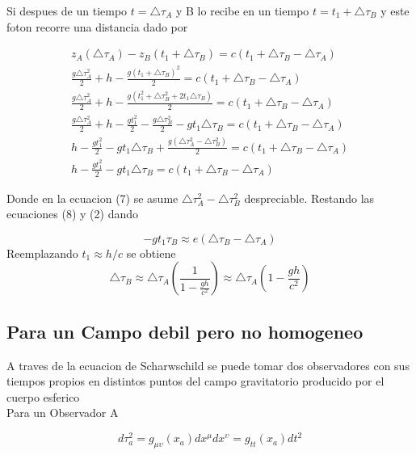 \documentclass[12pt,twoside]{rif}
\begin{document}
Si despues de un tiempo $t=\triangle\tau_{A} $ y B lo recibe en un tiempo 
$ t=t_{1}+\triangle\tau_{B} $ y este foton recorre una distancia dado por

\begin{eqnarray}
z_{A}(\triangle\tau_{A})-z_{B}(t_{1}+\triangle\tau_{B})=c(t_{1}+\triangle\tau_{B}-\triangle\tau_{A}) \\
\frac{g\triangle\tau_{A}^{2}}{2}+h-\frac{g(t_{1}+\triangle\tau_{B})^{2}}{2}=c(t_{1}+\triangle\tau_{B}-\triangle\tau_{A}) \\
\frac{g\triangle\tau_{A}^{2}}{2}+h-\frac{g(t_{1}^{2}+\triangle\tau_{B}^{2}+2t_{1}\triangle\tau_{B})}{2}=c(t_{1}+\triangle\tau_{B}-\triangle\tau_{A}) \\
\frac{g\triangle\tau_{A}^{2}}{2}+h-\frac{gt_{1}^2}{2}-\frac{g\triangle\tau_{B}^{2}}{2}-gt_{1}\triangle\tau_{B}=c(t_{1}+\triangle\tau_{B}-\triangle\tau_{A})\\
h-\frac{gt_{1}^{2}}{2}-gt_{1}\triangle\tau_{B}+\frac{g(\triangle\tau_{A}^{2}-\triangle\tau_{B}^{2})}{2}=c(t_{1}+\triangle\tau_{B}-\triangle\tau_{A})\\
h-\frac{gt_{1}^{2}}{2}-gt_{1}\triangle\tau_{B}=c(t_{1}+\triangle\tau_{B}-\triangle\tau_{A})
\end{eqnarray}

Donde en la ecuacion (7) se asume $\triangle\tau_{A}^{2}-\triangle\tau_{B}^{2}$ despreciable. Restando las ecuaciones (8) y (2) dando

\begin{equation}
-gt_{1}\tau_{B}\approx e(\triangle\tau_{B}-\triangle\tau_{A})
\end{equation}
Reemplazando $t_{1}\approx h/c$ se obtiene
\begin{equation}
\triangle\tau_{B}\approx\triangle\tau_{A}\left(\frac{1}{1-\frac{gh}{c^{2}}}\right)\approx\triangle\tau_{A}\left(1-\frac{gh}{c^{2}}\right)
\end{equation}
	\subsection{Para un Campo debil pero no homogeneo}
A traves de la ecuacion de Scharwschild se puede tomar dos observadores con sus tiempos propios en distintos puntos del campo gravitatorio producido por el cuerpo esferico\\
Para un Observador A

\begin{equation}
d\tau_{a}^{2}=g_{\mu\upsilon}(x_{a})dx^{\mu}dx^{\upsilon}=g_{tt}(x_{a})dt^{2}
\end{equation}
\end{document}
